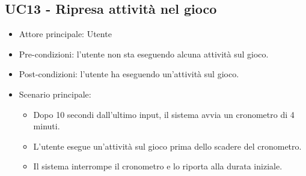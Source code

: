 \subsection{UC13 - Ripresa attività nel gioco}
\begin{itemize}
    \item Attore principale: Utente
    \item Pre-condizioni: l'utente non sta eseguendo alcuna attività sul gioco.
    \item Post-condizioni: l'utente ha eseguendo un'attività sul gioco.
    \item Scenario principale: \begin{itemize}
        \item Dopo 10 secondi dall'ultimo input, il sistema avvia un cronometro di 4 minuti.
        \item L'utente esegue un'attività sul gioco prima dello scadere del cronometro.
        \item Il sistema interrompe il cronometro e lo riporta alla durata iniziale.
    \end{itemize}
\end{itemize}
\newpage
